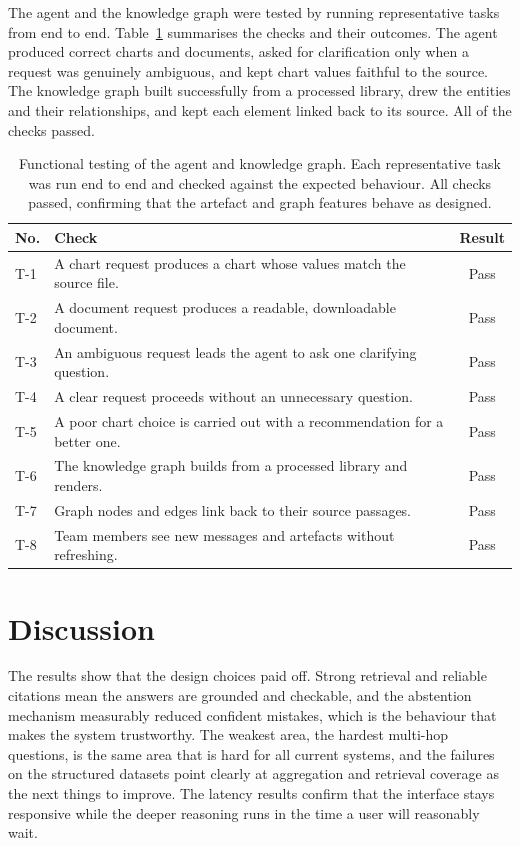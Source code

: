The agent and the knowledge graph were tested by running representative tasks from
end to end. Table~\ref{tab:functional} summarises the checks and their outcomes.
The agent produced correct charts and documents, asked for clarification only when
a request was genuinely ambiguous, and kept chart values faithful to the source.
The knowledge graph built successfully from a processed library, drew the entities
and their relationships, and kept each element linked back to its source. All of
the checks passed.

\begin{table}[H]
  \centering
  \caption{Functional testing of the agent and knowledge graph. Each
  representative task was run end to end and checked against the expected
  behaviour. All checks passed, confirming that the artefact and graph features
  behave as designed.}
  \label{tab:functional}
  \small
  \begin{tabularx}{\textwidth}{@{}p{}Xc@{}}
    \toprule
    \textbf{No.} & \textbf{Check} & \textbf{Result} \\
    \midrule
    T-1 & A chart request produces a chart whose values match the source file. & Pass \\
    T-2 & A document request produces a readable, downloadable document. & Pass \\
    T-3 & An ambiguous request leads the agent to ask one clarifying question. & Pass \\
    T-4 & A clear request proceeds without an unnecessary question. & Pass \\
    T-5 & A poor chart choice is carried out with a recommendation for a better one. & Pass \\
    T-6 & The knowledge graph builds from a processed library and renders. & Pass \\
    T-7 & Graph nodes and edges link back to their source passages. & Pass \\
    T-8 & Team members see new messages and artefacts without refreshing. & Pass \\
    \bottomrule
  \end{tabularx}
\end{table}

\section{Discussion}

The results show that the design choices paid off. Strong retrieval and reliable
citations mean the answers are grounded and checkable, and the abstention
mechanism measurably reduced confident mistakes, which is the behaviour that makes
the system trustworthy. The weakest area, the hardest multi-hop questions, is the
same area that is hard for all current systems, and the failures on the structured
datasets point clearly at aggregation and retrieval coverage as the next things to
improve. The latency results confirm that the interface stays responsive while the
deeper reasoning runs in the time a user will reasonably wait.


